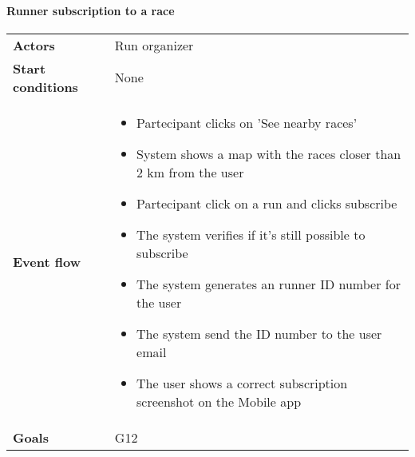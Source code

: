 \paragraph{Runner subscription to a race}
\begin{center}
\begin{table}[H]
\centering
\begin{tabular}{l|l}
\textbf{Actors} & Run organizer\\
\textbf{Start conditions} & None \\
\textbf{Event flow}  & \begin{minipage}[t]{0.7\textwidth}
    \begin{itemize}
       \item Partecipant clicks on 'See nearby races'

        \item System shows a map with the races closer than 2 km from the user

\item Partecipant click on a run and clicks subscribe
\item The system verifies if it's still possible to subscribe

\item The system generates an runner ID number for the user
\item The system send the ID number to the user email
\item The user shows a correct subscription screenshot on the Mobile app

    \end{itemize}
    \end{minipage}
    \\
\textbf{Goals} & G12
\end{tabular}

\end{table}
\end{center}

